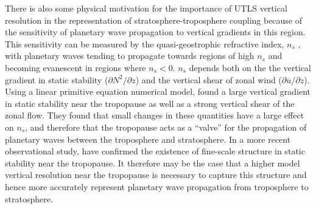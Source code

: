There is also some physical motivation for the importance of UTLS vertical
resolution in the representation of stratosphere-troposphere coupling because of
the sensitivity of planetary wave propagation to vertical gradients in this
region. This sensitivity can be measured by the quasi-geostrophic refractive
index, $n_{s}$ \citep{Matsuno1970}, with planetary waves tending to propagate
towards regions of high $n_{s}$ and becoming evanescent in regions where
$n_{s}<0$. $n_{s}$ depends both on the the vertical gradient in static stability
($\partial N^2/\partial z$) and the vertical shear of zonal wind
($\partial\overline{u}/\partial z$). Using a linear primitive equation numerical
model, \citet{Chen1992} found a large vertical gradient in static stability near
the tropopause as well as a strong vertical shear of the zonal flow. They found
that small changes in these quantities have a large effect on $n_{s}$, and
therefore that the tropopause acts as a ``valve'' for the propagation of
planetary waves between the troposphere and stratosphere. In a more recent
observational study, \citet{Grise2010} have confirmed the existence of
fine-scale structure in static stability near the tropopause. It therefore may
be the case that a higher model vertical resolution near the tropopause is
necessary to capture this structure and hence more accurately represent
planetary wave propagation from troposphere to stratosphere.



